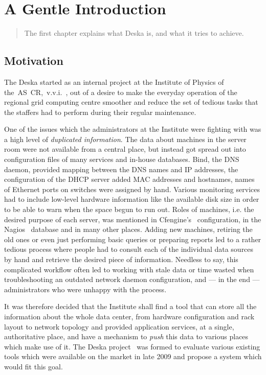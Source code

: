 \documentclass[deska]{subfiles}
\begin{document}
\chapter{A Gentle Introduction}

\begin{abstract}
The first chapter explains what Deska is, and what it tries to achieve.
\end{abstract}

\section{Motivation}

The Deska started as an internal project at the Institute of Physics of the~AS~CR,~v.v.i.~\cite{fzu}, out of a desire to make the
everyday operation of the regional grid computing centre smoother and reduce the set of tedious tasks that the staffers
had to perform during their regular maintenance.

One of the issues which the administrators at the Institute were fighting with was a high level of {\em duplicated
information}.  The data about machines in the server room were not available from a central place, but instead got
spread out into configuration files of many services and in-house databases.  Bind, the DNS daemon, provided mapping
between the DNS names and IP addresses, the configuration of the DHCP server added MAC addresses and hostnames, names of
Ethernet ports on switches were assigned by hand.  Various monitoring services had to include low-level hardware
information like the available disk size in order to be able to warn when the space begun to run out.  Roles of
machines, i.e. the desired purpose of each server, was mentioned in Cfengine's~\cite{cfengine} configuration, in the
Nagios~\cite{nagios} database and in many other places.  Adding new machines, retiring the old ones or even just
performing basic queries or preparing reports led to a rather tedious process where people had to consult each of the
individual data sources by hand and retrieve the desired piece of information.  Needless to say, this complicated
workflow often led to working with stale data or time wasted when troubleshooting an outdated network daemon
configuration, and --- in the end --- administrators who were unhappy with the process.

It was therefore decided that the Institute shall find a tool that can store all the information about the whole data
center, from hardware configuration and rack layout to network topology and provided application services, at a single,
authoritative place, and have a mechanism to {\em push} this data to various places which make use of it.  The Deska
project~\cite{deska-project} was formed to evaluate various existing tools which were available on the market in late
2009 and propose a system which would fit this goal.
\end{document}
